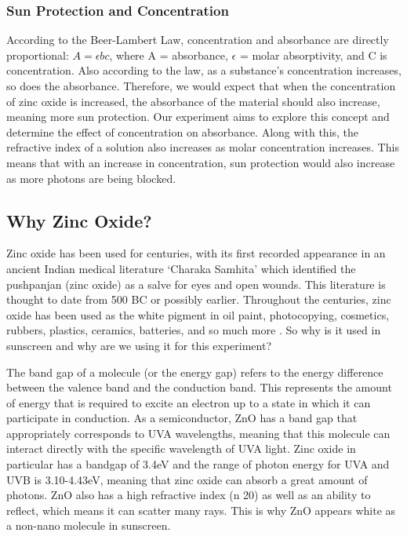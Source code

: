 \documentclass{article}
\begin{document}
\subsubsection{Sun Protection and Concentration}
According to the Beer-Lambert Law, concentration and absorbance are directly proportional: $A = \epsilon bc$, where A = absorbance, $\epsilon$ = molar absorptivity, and C is concentration. Also according to the law, as a substance’s concentration increases, so does the absorbance. Therefore, we would expect that when the concentration of zinc oxide is increased, the absorbance of the material should also increase, meaning more sun protection. Our experiment aims to explore this concept and determine the effect of concentration on absorbance. Along with this, the refractive index of a solution also increases as molar concentration increases. This means that with an increase in concentration, sun protection would also increase as more photons are being blocked.

\subsection{Why Zinc Oxide?}
Zinc oxide has been used for centuries, with its first recorded appearance in an ancient Indian medical literature ‘Charaka Samhita’ which identified the pushpanjan (zinc oxide) as a salve for eyes and open wounds. This literature is thought to date from 500 BC or possibly earlier. Throughout the centuries, zinc oxide has been used as the white pigment in oil paint, photocopying, cosmetics, rubbers, plastics, ceramics, batteries, and so much more \cite{grabenhofer_inside_2022}. So why is it used in sunscreen and why are we using it for this experiment?

The band gap of a molecule (or the energy gap) refers to the energy difference between the valence band and the conduction band. This represents the amount of energy that is required to excite an electron up to a state in which it can participate in conduction. As a semiconductor, ZnO has a band gap that appropriately corresponds to UVA wavelengths, meaning that this molecule can interact directly with the specific wavelength of UVA light. Zinc oxide in particular has a bandgap of 3.4eV and the range of photon energy for UVA and UVB is 3.10-4.43eV, meaning that zinc oxide can absorb a great amount of photons. ZnO also has a high refractive index (n  20) as well as an ability to reflect, which means it can scatter many rays. This is why ZnO appears white as a non-nano molecule in sunscreen.
\end{document}
